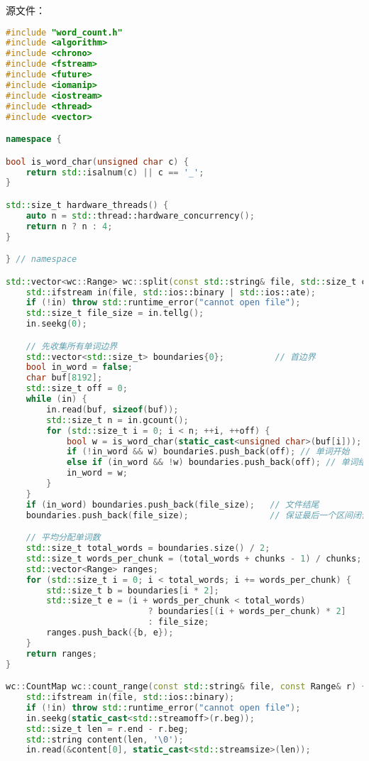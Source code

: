 源文件：
\begin{lstlisting}[language=C++]
#include "word_count.h"
#include <algorithm>
#include <chrono>
#include <fstream>
#include <future>
#include <iomanip>
#include <iostream>
#include <thread>
#include <vector>

namespace {

bool is_word_char(unsigned char c) {
    return std::isalnum(c) || c == '_';
}

std::size_t hardware_threads() {
    auto n = std::thread::hardware_concurrency();
    return n ? n : 4;
}

} // namespace

std::vector<wc::Range> wc::split(const std::string& file, std::size_t chunks) {
    std::ifstream in(file, std::ios::binary | std::ios::ate);
    if (!in) throw std::runtime_error("cannot open file");
    std::size_t file_size = in.tellg();
    in.seekg(0);

    // 先收集所有单词边界
    std::vector<std::size_t> boundaries{0};          // 首边界
    bool in_word = false;
    char buf[8192];
    std::size_t off = 0;
    while (in) {
        in.read(buf, sizeof(buf));
        std::size_t n = in.gcount();
        for (std::size_t i = 0; i < n; ++i, ++off) {
            bool w = is_word_char(static_cast<unsigned char>(buf[i]));
            if (!in_word && w) boundaries.push_back(off); // 单词开始
            else if (in_word && !w) boundaries.push_back(off); // 单词结束
            in_word = w;
        }
    }
    if (in_word) boundaries.push_back(file_size);   // 文件结尾
    boundaries.push_back(file_size);                // 保证最后一个区间闭合

    // 平均分配单词数
    std::size_t total_words = boundaries.size() / 2;
    std::size_t words_per_chunk = (total_words + chunks - 1) / chunks;
    std::vector<Range> ranges;
    for (std::size_t i = 0; i < total_words; i += words_per_chunk) {
        std::size_t b = boundaries[i * 2];
        std::size_t e = (i + words_per_chunk < total_words)
                            ? boundaries[(i + words_per_chunk) * 2]
                            : file_size;
        ranges.push_back({b, e});
    }
    return ranges;
}

wc::CountMap wc::count_range(const std::string& file, const Range& r) {
    std::ifstream in(file, std::ios::binary);
    if (!in) throw std::runtime_error("cannot open file");
    in.seekg(static_cast<std::streamoff>(r.beg));
    std::size_t len = r.end - r.beg;
    std::string content(len, '\0');
    in.read(&content[0], static_cast<std::streamsize>(len));


\end{lstlisting}
